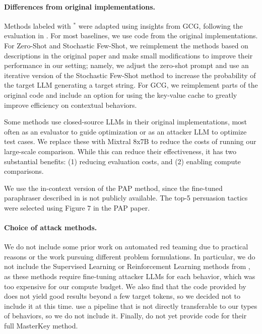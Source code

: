\paragraph{Differences from original implementations.}
Methods labeled with ${}^*$ were adapted using insights from GCG, following the evaluation in \citet{zou2023universal}. For most baselines, we use code from the original implementations. For Zero-Shot and Stochastic Few-Shot, we reimplement the methods based on descriptions in the original paper \citep{perez2022red} and make small modifications to improve their performance in our setting; namely, we adjust the zero-shot prompt and use an iterative version of the Stochastic Few-Shot method to increase the probability of the target LLM generating a target string. For GCG, we reimplement parts of the original code and include an option for using the key-value cache to greatly improve efficiency on contextual behaviors.

Some methods use closed-source LLMs in their original implementations, most often as an evaluator to guide optimization or as an attacker LLM to optimize test cases. We replace these with Mixtral 8x7B to reduce the costs of running our large-scale comparison. While this can reduce their effectiveness, it has two substantial benefits: (1) reducing evaluation costs, and (2) enabling compute comparisons.

We use the in-context version of the PAP method, since the fine-tuned paraphraser described in \citep{zeng2024johnny} is not publicly available. The top-5 persuasion tactics were selected using Figure $7$ in the PAP paper.



\paragraph{Choice of attack methods.}
We do not include some prior work on automated red teaming due to practical reasons or the work pursuing different problem formulations. In particular, we do not include the Supervised Learning or Reinforcement Learning methods from \citep{perez2022red}, as these methods require fine-tuning attacker LLMs for each behavior, which was too expensive for our compute budget. We also find that the code provided by \citet{jones2023automatically} does not yield good results beyond a few target tokens, so we decided not to include it at this time. \citet{shah2023scalable} use a pipeline that is not directly transferable to our types of behaviors, so we do not include it. Finally, \citet{dengmasterkey} do not yet provide code for their full MasterKey method.






